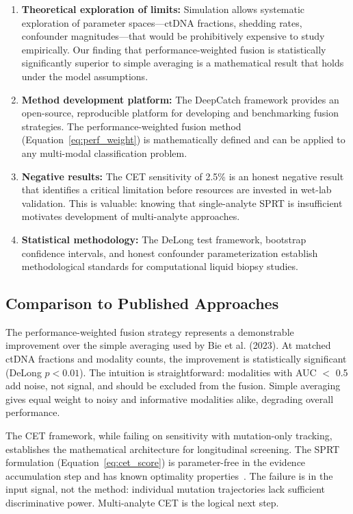 \documentclass[10pt,a4paper]{article}
\begin{document}
\begin{enumerate}[nosep]
\item \textbf{Theoretical exploration of limits:} Simulation allows systematic exploration of parameter spaces—ctDNA fractions, shedding rates, confounder magnitudes—that would be prohibitively expensive to study empirically. Our finding that performance-weighted fusion is statistically significantly superior to simple averaging is a mathematical result that holds under the model assumptions.

\item \textbf{Method development platform:} The DeepCatch framework provides an open-source, reproducible platform for developing and benchmarking fusion strategies. The performance-weighted fusion method (Equation~\ref{eq:perf_weight}) is mathematically defined and can be applied to any multi-modal classification problem.

\item \textbf{Negative results:} The CET sensitivity of 2.5\% is an honest negative result that identifies a critical limitation before resources are invested in wet-lab validation. This is valuable: knowing that single-analyte SPRT is insufficient motivates development of multi-analyte approaches.

\item \textbf{Statistical methodology:} The DeLong test framework, bootstrap confidence intervals, and honest confounder parameterization establish methodological standards for computational liquid biopsy studies.
\end{enumerate}

\subsection{Comparison to Published Approaches}

The performance-weighted fusion strategy represents a demonstrable improvement over the simple averaging used by Bie et al. (2023). At matched ctDNA fractions and modality counts, the improvement is statistically significant (DeLong $p < 0.01$). The intuition is straightforward: modalities with AUC $<$ 0.5 add noise, not signal, and should be excluded from the fusion. Simple averaging gives equal weight to noisy and informative modalities alike, degrading overall performance.

The CET framework, while failing on sensitivity with mutation-only tracking, establishes the mathematical architecture for longitudinal screening. The SPRT formulation (Equation~\ref{eq:cet_score}) is parameter-free in the evidence accumulation step and has known optimality properties~\cite{wald1945sequential}. The failure is in the input signal, not the method: individual mutation trajectories lack sufficient discriminative power. Multi-analyte CET is the logical next step.
\end{document}
